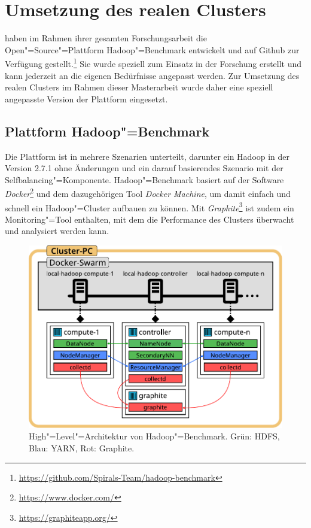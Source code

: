 \section{Umsetzung des realen Clusters}\label{sec:aufbauCluster}

\citeauthor{zhang2016} haben im Rahmen ihrer gesamten Forschungsarbeit die Open"=Source"=Plattform Hadoop"=Benchmark entwickelt und auf Github zur Verfügung gestellt.\footnote{\url{https://github.com/Spirals-Team/hadoop-benchmark}}
Sie wurde speziell zum Einsatz in der Forschung erstellt und kann jederzeit an die eigenen Bedürfnisse angepasst werden.
Zur Umsetzung des realen Clusters im Rahmen dieser Masterarbeit wurde daher eine speziell angepasste Version der Plattform eingesetzt.

\subsection{Plattform Hadoop"=Benchmark}\label{sec:hadoopBenchmark}

Die Plattform ist in mehrere Szenarien unterteilt, darunter ein Hadoop in der Version 2.7.1 ohne Änderungen und ein darauf basierendes Szenario mit der Selfbalancing"=Komponente.
Hadoop"=Benchmark basiert auf der Software \emph{Docker}\footnote{\url{https://www.docker.com/}} und dem dazugehörigen Tool \emph{Docker Machine}, um damit einfach und schnell ein Hadoop"=Cluster aufbauen zu können.
Mit \emph{Graphite}\footnote{\url{https://graphiteapp.org/}} ist zudem ein Monitoring"=Tool enthalten, mit dem die Performance des Clusters überwacht und analysiert werden kann.

\begin{figure}
    \includegraphics{./images/hadoopBenchmarkArch.pdf}
    \caption[High"=Level"=Architektur von Hadoop"=Benchmark]
    {High"=Level"=Architektur von Hadoop"=Benchmark. Grün: \ac{HDFS}, Blau: YARN, Rot: Graphite.}
    \label{fig:hadoopBenchmarkArchitecture}
\end{figure}

